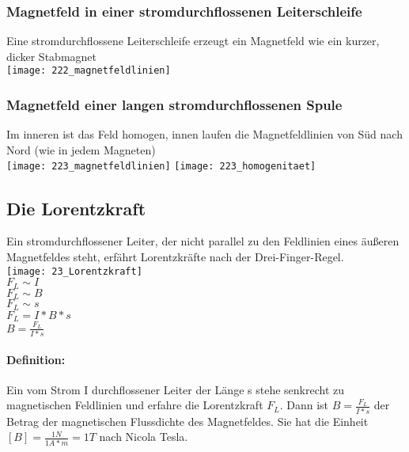 \subsubsection{Magnetfeld in einer stromdurchflossenen Leiterschleife}
Eine stromdurchflossene Leiterschleife erzeugt ein Magnetfeld wie ein kurzer, dicker Stabmagnet \\
\texttt{[image: 222\_magnetfeldlinien]}

\subsubsection{Magnetfeld einer langen stromdurchflossenen Spule}
Im inneren ist das Feld homogen, innen laufen die Magnetfeldlinien von Süd nach Nord (wie in jedem Magneten) \\
\texttt{[image: 223\_magnetfeldlinien]}
\texttt{[image: 223\_homogenitaet]}
\newpage

\subsection{Die Lorentzkraft}
Ein stromdurchflossener Leiter, der nicht parallel zu den Feldlinien eines äußeren Magnetfeldes steht, erfährt Lorentzkräfte nach der Drei-Finger-Regel. \\
\texttt{[image: 23\_Lorentzkraft]} \\
$ F_L \sim I $ 
\vspace{1mm} \\
$ F_L \sim B $
\vspace{1mm} \\
$ F_L \sim s $
\vspace{1mm} \\
$ F_L = I \ast B \ast s $
\vspace{1mm} \\
$ B = \frac{F_L}{I \ast s} $

\paragraph{Definition:} Ein vom Strom I durchflossener Leiter der Länge s stehe senkrecht zu magnetischen Feldlinien und erfahre die Lorentzkraft $F_L$. Dann ist $B = \frac{F_L}{I \ast s}$ der Betrag der magnetischen Flussdichte des Magnetfeldes. Sie hat die Einheit $ [B] = \frac{1N}{1A \ast m} = 1T$ nach Nicola Tesla.


